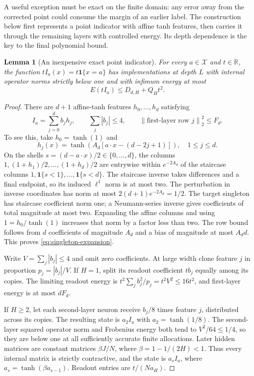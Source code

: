 \documentclass[11pt]{article}
\newtheorem{lemma}[theorem]{Lemma}
\theoremstyle{remark}\newtheorem{remark}[theorem]{Remark}
\newcommand{\R}{\mathbb R}\newcommand{\E}{\mathbb E}
\newcommand{\norm}[1]{\left\lVert#1\right\rVert}
\newcommand{\cX}{\mathcal X}\newcommand{\cS}{\mathcal S}
\begin{document}
A useful exception must be exact on the finite domain: any error away
from the corrected point could consume the margin of an earlier label.
The construction below first represents a point indicator with affine
tanh features, then carries it through the remaining layers with
controlled energy. Its depth dependence is the key to the final
polynomial bound.

\begin{lemma}[An inexpensive exact point indicator]\label{lem:singleton}
For every $a\in\cX$ and $t\in\R$, the function
$tI_a(x)=t\mathbf1\{x=a\}$ has implementations at depth $L$ with
internal operator norms strictly below one and with infimum energy at most
\[
 E(tI_a)\le D_{d,H}+Q_Ht^2.
\]
\end{lemma}
\begin{proof}
There are $d+1$ affine-tanh features $h_0,\ldots,h_d$ satisfying
\begin{equation}\label{eq:singleton-expansion}
 I_a=\sum_{j=0}^d b_jh_j,\qquad \sum_j|b_j|\le4,
 \qquad \norm{\text{first-layer row }j}_2^2\le F_d.
\end{equation}
To see this, take $h_0=\tanh(1)$ and
\[
 h_j(x)=\tanh\left(A_d[a\cdot x-(d-2j+1)]\right),\quad 1\le j\le d.
\]
On the shells $s=(d-a\cdot x)/2\in\{0,\ldots,d\}$, the columns
$1,(1+h_1)/2,\ldots,(1+h_d)/2$ are entrywise within
$e^{-2A_d}$ of the staircase columns
$1,\mathbf1\{s<1\},\ldots,\mathbf1\{s<d\}$.
The staircase inverse takes differences and a final endpoint, so its
induced $\ell^1$ norm is at most two. The perturbation in inverse
coordinates has norm at most
$2(d+1)e^{-2A_d}=1/2$. The target singleton has staircase coefficient
norm one; a Neumann-series inverse gives coefficients of total magnitude
at most two. Expanding the affine columns and using
$1=h_0/\tanh(1)$ increases that norm by a factor less than two.
The row bound follows from $d$ coefficients of magnitude $A_d$ and a
bias of magnitude at most $A_dd$. This proves
\eqref{eq:singleton-expansion}.

Write $V=\sum_j|b_j|\le4$ and omit zero coefficients. At large width
clone feature $j$ in proportion $p_j=|b_j|/V$. If $H=1$, split its
readout coefficient $tb_j$ equally among its copies. The limiting
readout energy is $t^2\sum_jb_j^2/p_j=t^2V^2\le16t^2$,
and first-layer energy is at most $dF_d$.

If $H\ge2$, let each second-layer neuron receive $b_j/8$ times feature
$j$, distributed across its copies. The resulting state is
$a_2I_a$ with $a_2=\tanh(1/8)$. The second-layer squared operator
norm and Frobenius energy both tend to
$V^2/64\le1/4$, so they are below one at all sufficiently accurate
finite allocations. Later hidden matrices are constant matrices
$\beta J/N$, where $\beta=1-1/(2H)<1$. Thus every internal matrix
is strictly contractive, and the state is $a_sI_a$, where
$a_s=\tanh(\beta a_{s-1})$. Readout entries are $t/(Na_H)$.


\end{proof}
\end{document}
